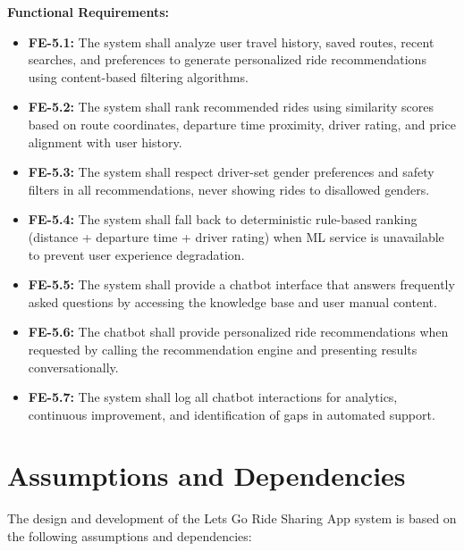 \textbf{Functional Requirements:}

\begin{itemize}
    \item \textbf{FE-5.1:} The system shall analyze user travel history, saved routes, recent searches, and preferences to generate personalized ride recommendations using content-based filtering algorithms.
    
    \item \textbf{FE-5.2:} The system shall rank recommended rides using similarity scores based on route coordinates, departure time proximity, driver rating, and price alignment with user history.
    
    \item \textbf{FE-5.3:} The system shall respect driver-set gender preferences and safety filters in all recommendations, never showing rides to disallowed genders.
    
    \item \textbf{FE-5.4:} The system shall fall back to deterministic rule-based ranking (distance + departure time + driver rating) when ML service is unavailable to prevent user experience degradation.
    
    \item \textbf{FE-5.5:} The system shall provide a chatbot interface that answers frequently asked questions by accessing the knowledge base and user manual content.
    
    \item \textbf{FE-5.6:} The chatbot shall provide personalized ride recommendations when requested by calling the recommendation engine and presenting results conversationally.
    
    \item \textbf{FE-5.7:} The system shall log all chatbot interactions for analytics, continuous improvement, and identification of gaps in automated support.
\end{itemize}


\section{Assumptions and Dependencies}

The design and development of the Lets Go Ride Sharing App system is based on the following assumptions and dependencies:

